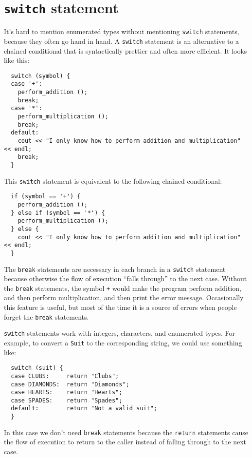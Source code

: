 \section{{\tt switch} statement}

It's hard to mention enumerated types without mentioning {\tt switch}
statements, because they often go hand in hand.  A {\tt switch} statement
is an alternative to a chained conditional that is syntactically
prettier and often more efficient.  It looks like this:

\begin{lstlisting}
  switch (symbol) {
  case '+':
    perform_addition ();
    break;
  case '*':
    perform_multiplication ();
    break;
  default:
    cout << "I only know how to perform addition and multiplication" << endl;
    break;
  }
\end{lstlisting}
%
This {\tt switch} statement is equivalent to the following chained
conditional:

\begin{lstlisting}
  if (symbol == '+') {
    perform_addition ();
  } else if (symbol == '*') {
    perform_multiplication ();
  } else {
    cout << "I only know how to perform addition and multiplication" << endl;
  }
\end{lstlisting}
%
The {\tt break} statements are necessary in each branch
in a {\tt switch} statement because otherwise the flow of execution
``falls through'' to the next case.  Without the {\tt break} statements,
the symbol {\tt +} would make the program perform addition, and
then perform multiplication, and then print the error message.
Occasionally this feature is useful, but most of the time it is
a source of errors when people forget the {\tt break} statements.


{\tt switch} statements work with integers, characters, and enumerated
\mbox{types}.  For example, to convert a {\tt Suit} to the corresponding
string, we could use something like:

\begin{lstlisting}
  switch (suit) {
  case CLUBS:     return "Clubs";
  case DIAMONDS:  return "Diamonds";
  case HEARTS:    return "Hearts";
  case SPADES:    return "Spades";
  default:        return "Not a valid suit";
  }
\end{lstlisting}
%
In this case we don't need {\tt break} statements because the
{\tt return} statements cause the flow of execution to return to
the caller instead of falling through to the next case.

